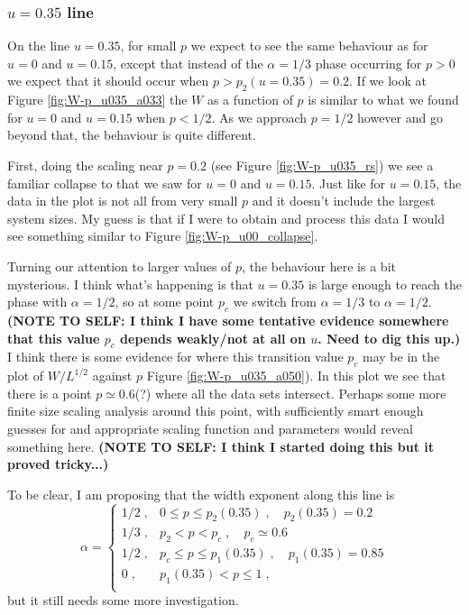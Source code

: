 \documentclass[a4paper,10pt]{article}
\newcommand{\fref}[1]{Figure \ref{#1}}
\begin{document}
\subsubsection{$u=0.35$ line}

On the line $u=0.35$, for small $p$ we expect to see the same behaviour as for $u = 0$ and $u=0.15$, except that instead of the $\alpha=1/3$ phase occurring for $p > 0$ we expect that it should occur when $p > p_2(u=0.35) = 0.2$. If we look at \fref{fig:W-p_u035_a033} the $W$ as a function of $p$ is similar to what we found for $u=0$ and $u = 0.15$ when $p < 1/2$. As we approach $p = 1/2$ however and go beyond that, the behaviour is quite different. 
\newline

First, doing the scaling near $p = 0.2$ (see \fref{fig:W-p_u035_rs}) we see a familiar collapse to that we saw for $u=0$ and $u=0.15$. Just like for $u = 0.15$, the data in the plot is not all from very small $p$ and it doesn't include the largest system sizes. My guess is that if I were to obtain and process this data I would see something similar to \fref{fig:W-p_u00_collapse}.
\newline

Turning our attention to larger values of $p$, the behaviour here is a bit mysterious. I think what's happening is that $u = 0.35$ is large enough to reach the phase with $\alpha = 1/2$, so at some point $p_c$ we switch from $\alpha = 1/3$ to $\alpha = 1/2$. {\bf (NOTE TO SELF: I think I have some tentative evidence somewhere that this value $p_c$ depends weakly/not at all on $u$. Need to dig this up.)} I think there is some evidence for where this transition value $p_c$ may be in the plot of $W/L^{1/2}$ against $p$ \fref{fig:W-p_u035_a050}). In this plot we see that there is a point $p \simeq 0.6$(?) where all the data sets intersect. Perhaps some more finite size scaling analysis around this point, with sufficiently smart enough guesses for and appropriate scaling function and parameters would reveal something here. {\bf (NOTE TO SELF: I think I started doing this but it proved tricky...)}

To be clear, I am proposing that the width exponent along this line is 
\begin{equation}
 \alpha = \begin{cases}
           1/2 \;, & 0 \le p \le p_2(0.35) \;,\quad p_2(0.35) = 0.2 \\
           1/3 \;, & p_2 < p < p_c \;,\quad p_c \simeq 0.6 \\
           1/2 \;, & p_c \le p \le p_1(0.35) \;,\quad p_1(0.35) = 0.85 \\
           0   \;, & p_1(0.35) < p \le 1 \;, \\
          \end{cases}
\end{equation}
but it still needs some more investigation.
\end{document}
